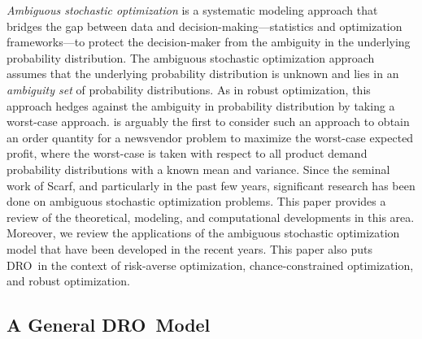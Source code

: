\documentclass[final,onefignum,onetabnum]{class}
\newcommand{\dro}{DRO}
\begin{document}
{\it Ambiguous stochastic optimization} is a systematic modeling approach that bridges the gap between data and decision-making---statistics
and optimization frameworks---to protect the decision-maker from the  ambiguity in the underlying probability distribution. %
The ambiguous stochastic optimization approach  assumes that the underlying probability distribution is unknown and lies in an {\it ambiguity set} of probability distributions. As in robust optimization, this approach hedges against the ambiguity in probability distribution by taking a worst-case approach.  \citet{scarf1958} is arguably the first to consider such  an approach to obtain an  order quantity for a newsvendor problem to maximize the worst-case expected profit, where the worst-case is taken with respect to all product demand probability distributions with a known mean and variance. Since the seminal work of Scarf, and particularly in the past few years, significant research has been done on ambiguous stochastic optimization problems. This paper provides a review of the theoretical, modeling, and computational developments in this area. Moreover, we review the applications of the ambiguous stochastic optimization model that have been developed in the recent years. 
This paper also puts \dro\ in the context of risk-averse optimization, chance-constrained optimization, and robust optimization. 

\subsection{A General \dro\ Model}
\label{sec: rev.generic_model}
\end{document}
